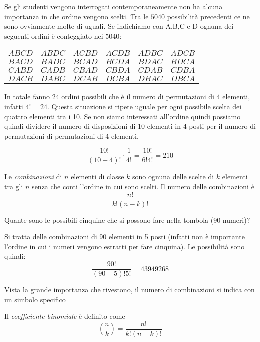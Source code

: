 Se gli studenti vengono interrogati contemporaneamente non ha alcuna importanza 
in che ordine vengono scelti. 
Tra le $5040$ possibilità precedenti ce ne sono ovviamente molte di uguali. Se 
indichiamo con A,B,C e D ognuna dei seguenti ordini è conteggiato nei $5040$:
\begin{center}
\begin{tabular}{cccccc}
$A B C D$ & $A B D C$ & $A C B D$ & $A C D B$ & $A D B C $ & $A D C B$\\
$B A C D$ & $B A D C$ & $B C A D$ & $B C D A$ & $B D A C $ & $B D C A$\\
$C A B D$ & $C A D B$ & $C B A D$ & $C B D A$ & $C D A B $ & $C D B A$\\
$D A C B$ & $D A B C$ & $D C A B$ & $D C B A$ & $D B A C $ & $D B C A$\\
\end{tabular}
\end{center}
In totale fanno $24$ ordini possibili che è il numero di permutazioni di 4 
elementi, infatti $4!=24$. Questa situazione si ripete uguale per ogni 
possibile scelta dei quattro elementi tra i 10. Se non siamo interessati 
all'ordine quindi possiamo quindi dividere il numero di disposizioni di 10 
elementi in 4 posti per il numero di permutazioni di permutazioni di 4 elementi.

$$\dfrac{10!}{(10-4)!}\cdot\dfrac{1}{4!}=\dfrac{10!}{6!4!}=210$$


\begin{definizione}
Le \emph{combinazioni} di $n$ elementi di classe $k$ sono ognuna delle scelte 
di $k$ elementi tra gli $n$ senza che conti l'ordine in cui sono scelti. Il 
numero delle combinazioni è
$$ \dfrac{n!}{k!(n-k)!}$$
\end{definizione}
\begin{esempio}
Quante sono le possibili cinquine che si possono fare nella tombola (90 numeri)?

Si tratta delle combinazioni di 90 elementi in 5 posti (infatti non è 
importante l'ordine in cui i numeri vengono estratti per fare cinquina). Le 
possibilità sono quindi:
$$ \dfrac{90!}{(90-5)!5!}=43 949 268$$
\end{esempio}

Vista la grande importanza che rivestono, il numero di combinazioni si indica 
con un simbolo specifico

\begin{definizione}
Il \emph{coefficiente binomiale} è definito come 
$$ \binom{n}{k}=\dfrac{n!}{k!(n-k)!}$$
\end{definizione}



